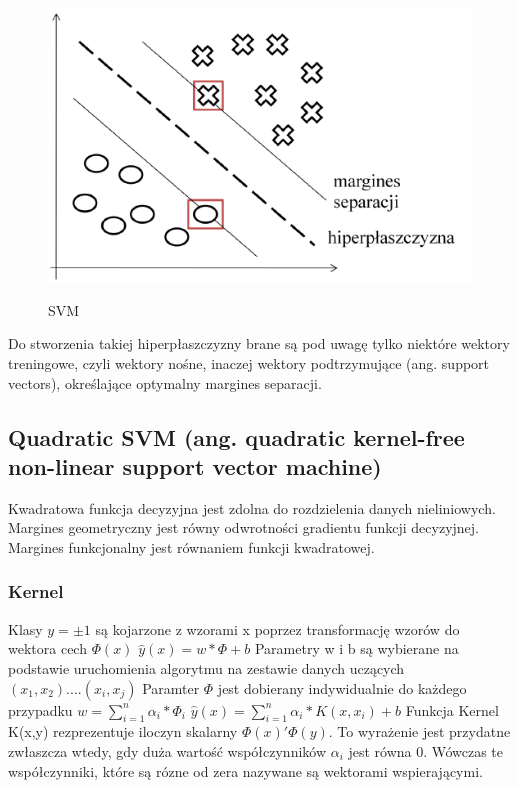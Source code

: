 \documentclass[[10pt,a4paper]{article}
\begin{document}
\begin{figure}[h]
\centering
\includegraphics{SVM}\\
\caption{SVM}
\end{figure}

Do stworzenia takiej hiperpłaszczyzny brane są pod uwagę tylko niektóre wektory
treningowe, czyli wektory nośne, inaczej wektory podtrzymujące (ang. support vectors),
określające optymalny margines separacji.

\subsection{Quadratic SVM (ang. quadratic kernel-free non-linear support vector machine)}

Kwadratowa funkcja decyzyjna jest zdolna do rozdzielenia danych nieliniowych. 
Margines geometryczny jest równy odwrotności gradientu funkcji decyzyjnej.
Margines funkcjonalny jest równaniem funkcji kwadratowej.
\subsubsection{Kernel}
Klasy $y=\pm 1$ są kojarzone z wzorami x poprzez transformację wzorów do wektora cech $\Phi(x)$
\newline
$\widehat{y}(x) = w*\Phi+b$ 
\newline
Parametry w i b są wybierane na podstawie uruchomienia algorytmu na zestawie danych uczących $(x_1,x_2)....(x_i,x_j)$
\newline 
Paramter $\Phi$ jest dobierany indywidualnie do każdego przypadku
\newline
$w = \sum_{i=1}^{n}\alpha_i*\Phi_i $
\newline
$\widehat{y}(x) =  \sum_{i=1}^{n}\alpha_i*K(x,x_i)+b$
\newline
Funkcja Kernel K(x,y) rezprezentuje iloczyn skalarny $\Phi(x)'\Phi(y) $. To wyrażenie jest przydatne zwłaszcza wtedy, gdy duża wartość współczynników $\alpha_i$ jest równa 0. Wówczas te współczynniki, które są rózne od zera nazywane są wektorami wspierającymi. 
\end{document}
